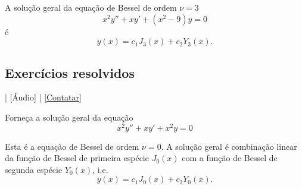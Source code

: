   \begin{ex}
    A solução geral da equação de Bessel de ordem $\nu=3$
    \begin{equation}
      x^2y'' + xy' + \left(x^2 - 9\right)y = 0
    \end{equation}
    é
    \begin{equation}
      y(x) = c_1J_{3}(x) + c_2Y_3(x).
    \end{equation}  
  \end{ex}

  \subsection*{Exercícios resolvidos}

    \begin{flushright}
    [Vídeo] | [Áudio] | \href{https://phkonzen.github.io/notas/contato.html}{[Contatar]}
  \end{flushright}

  \begin{exeresol}
    Forneça a solução geral da equação
    \begin{equation}
      x^2y'' + xy' + x^2y = 0
    \end{equation}
  \end{exeresol}
  \begin{resol}
    Esta é a equação de Bessel de ordem $\nu = 0$. A solução geral é combinação linear da função de Bessel de primeira espécie $J_0(x)$ com a função de Bessel de segunda espécie $Y_0(x)$, i.e.
    \begin{equation}
      y(x) = c_1J_0(x) + c_2Y_0(x).
    \end{equation}
  \end{resol}


